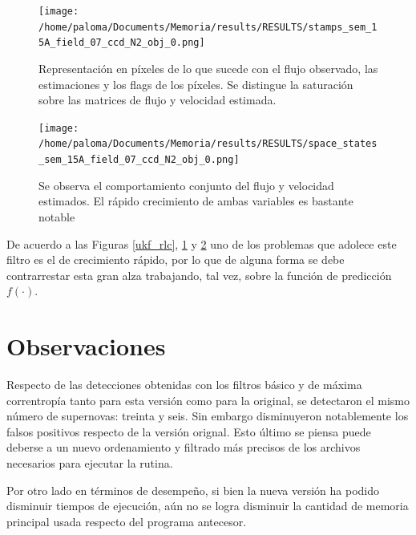 \begin{figure}
\centering
\texttt{[image: /home/paloma/Documents/Memoria/results/RESULTS/stamps\_sem\_15A\_field\_07\_ccd\_N2\_obj\_0.png]}
\caption{Representaci\'on en p\'ixeles de lo que sucede con el flujo observado, las estimaciones y los flags de los p\'ixeles. Se distingue la saturaci\'on sobre las matrices de flujo y velocidad estimada.}
\label{ukf_stamp}
\end{figure}

\begin{figure}
\centering
\texttt{[image: /home/paloma/Documents/Memoria/results/RESULTS/space\_states\_sem\_15A\_field\_07\_ccd\_N2\_obj\_0.png]}
\caption{Se observa el comportamiento conjunto del flujo y velocidad estimados. El r\'apido crecimiento de ambas variables es bastante notable}
\label{ukf_rss}
\end{figure}

De acuerdo a las Figuras \ref{ukf_rlc}, \ref{ukf_stamp} y \ref{ukf_rss} uno de los problemas que adolece este filtro es el de crecimiento r\'apido, por lo que de alguna forma se debe contrarrestar esta gran alza trabajando,  tal vez, sobre la funci\'on de predicci\'on $f(\cdot)$.

\section{Observaciones}
Respecto de las detecciones obtenidas con los filtros b\'asico y de m\'axima correntrop\'ia tanto para esta versi\'on como para la original, se detectaron el mismo  n\'umero de supernovas: treinta y seis. Sin embargo disminuyeron notablemente los falsos positivos respecto de la versi\'on orignal. Esto \'ultimo se piensa puede deberse a un nuevo ordenamiento y filtrado m\'as precisos de los archivos necesarios para ejecutar la rutina.
\bigskip

Por otro lado en t\'erminos de desempe\~no, si bien la nueva versi\'on ha podido disminuir tiempos de ejecuci\'on, a\'un no se logra disminuir la cantidad de memoria principal usada respecto del programa antecesor.  
